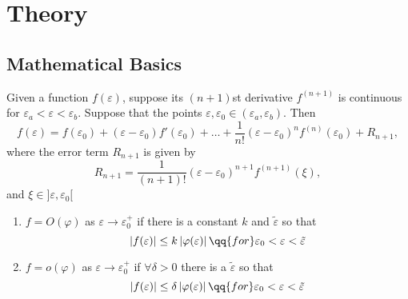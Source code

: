 \section{Theory}%
\label{sec:theory}

\subsection{Mathematical Basics}%
\label{sub:mathematical_basics}

\begin{frame}
   \begin{theorem}
       Given a function \(f(\varepsilon)\), suppose its \((n+1)\)st derivative \(f^{(n+1)}\) is continuous for
       \(\varepsilon_a < \varepsilon < \varepsilon_b\). Suppose that the points \(\varepsilon,\varepsilon_0 \in (\varepsilon_a,
       \varepsilon_b)\). Then
       \[
           f(\varepsilon) = f(\varepsilon_0) + (\varepsilon - \varepsilon_0)f'(\varepsilon_0) + \ldots
           + \frac{1}{n!}(\varepsilon - \varepsilon_0)^n f^{(n)}(\varepsilon_0) + R_{n+1},
       \]
       where the error term \(R_{n+1}\) is given by
       \[
           R_{n+1} = \frac{1}{(n+1)!}(\varepsilon - \varepsilon_0)^{n+1} f^{(n+1)}(\xi),
       \]
       and \(\xi \in ]\varepsilon, \varepsilon_0 [\)
    \end{theorem}
\end{frame}

\begin{frame}
    \begin{definition}\leavevmode
        \begin{enumerate}
            \item<+-> \(f = O(\varphi)\) as \(\varepsilon \to \varepsilon_0^{+}\) if there is a constant \(k\) and
                \(\tilde{\varepsilon}\) so that \[
                    \left| f(\varepsilon) \right| \le k \left| \varphi(\varepsilon) \right| \qq{for} \varepsilon_0
                    < \varepsilon < \tilde{\varepsilon}
                \] 

            \item<+-> \(f = o(\varphi)\) as \(\varepsilon \to \varepsilon_0^{+}\) if \(\forall \delta > 0\) there is
                a \(\tilde{\varepsilon}\) so that \[
                    \left| f(\varepsilon) \right| \le \delta \left| \varphi(\varepsilon) \right| \qq{for} \varepsilon_0
                    < \varepsilon < \tilde{\varepsilon}
                \] 
        \end{enumerate}
    \end{definition}
\end{frame}


